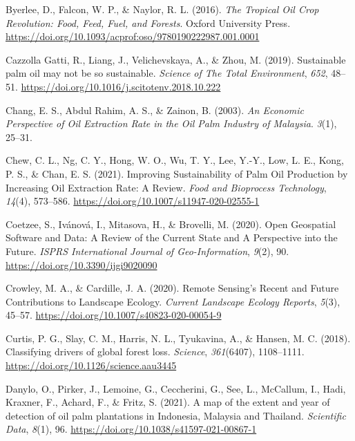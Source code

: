 \documentclass[
  letterpaper,
  DIV=11,
  numbers=noendperiod]{scrreprt}
\newlength{\cslhangindent}
\newlength{\cslentryspacingunit} %
\newenvironment{CSLReferences}[2] %
 {%
  \setlength{\parindent}{0pt}
  \ifodd #1
  \let\oldpar\par
  \def\par{\hangindent=\cslhangindent\oldpar}
  \fi
  \setlength{\parskip}{#2\cslentryspacingunit}
 }%
 {}
\begin{document}
\begin{CSLReferences}{1}{0}
\leavevmode{}%
Byerlee, D., Falcon, W. P., \& Naylor, R. L. (2016). \emph{The {Tropical
Oil Crop Revolution}: {Food}, {Feed}, {Fuel}, and {Forests}}. {Oxford
University Press}.
\url{https://doi.org/10.1093/acprof:oso/9780190222987.001.0001}

\leavevmode{}%
Cazzolla Gatti, R., Liang, J., Velichevskaya, A., \& Zhou, M. (2019).
Sustainable palm oil may not be so sustainable. \emph{Science of The
Total Environment}, \emph{652}, 48--51.
\url{https://doi.org/10.1016/j.scitotenv.2018.10.222}

\leavevmode{}%
Chang, E. S., Abdul Rahim, A. S., \& Zainon, B. (2003). \emph{An
{Economic Perspective} of {Oil Extraction Rate} in the {Oil Palm
Industry} of {Malaysia}}. \emph{3}(1), 25--31.

\leavevmode{}%
Chew, C. L., Ng, C. Y., Hong, W. O., Wu, T. Y., Lee, Y.-Y., Low, L. E.,
Kong, P. S., \& Chan, E. S. (2021). Improving {Sustainability} of {Palm
Oil Production} by {Increasing Oil Extraction Rate}: A {Review}.
\emph{Food and Bioprocess Technology}, \emph{14}(4), 573--586.
\url{https://doi.org/10.1007/s11947-020-02555-1}

\leavevmode{}%
Coetzee, S., Ivánová, I., Mitasova, H., \& Brovelli, M. (2020). Open
{Geospatial Software} and {Data}: {A Review} of the {Current State} and
{A Perspective} into the {Future}. \emph{ISPRS International Journal of
Geo-Information}, \emph{9}(2), 90.
\url{https://doi.org/10.3390/ijgi9020090}

\leavevmode{}%
Crowley, M. A., \& Cardille, J. A. (2020). Remote {Sensing}'s {Recent}
and {Future Contributions} to {Landscape Ecology}. \emph{Current
Landscape Ecology Reports}, \emph{5}(3), 45--57.
\url{https://doi.org/10.1007/s40823-020-00054-9}

\leavevmode{}%
Curtis, P. G., Slay, C. M., Harris, N. L., Tyukavina, A., \& Hansen, M.
C. (2018). Classifying drivers of global forest loss. \emph{Science},
\emph{361}(6407), 1108--1111.
\url{https://doi.org/10.1126/science.aau3445}

\leavevmode{}%
Danylo, O., Pirker, J., Lemoine, G., Ceccherini, G., See, L., McCallum,
I., Hadi, Kraxner, F., Achard, F., \& Fritz, S. (2021). A map of the
extent and year of detection of oil palm plantations in {Indonesia},
{Malaysia} and {Thailand}. \emph{Scientific Data}, \emph{8}(1), 96.
\url{https://doi.org/10.1038/s41597-021-00867-1}


\end{CSLReferences}
\end{document}
